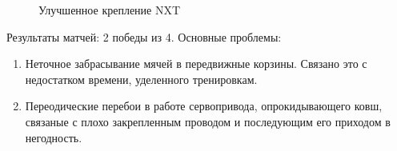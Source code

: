 \begin{enumerate}
	\begin{figure}[H]
		\begin{minipage}[h]{0.98\linewidth}
		\end{minipage}
		\caption{Улучшенное крепление NXT}
	\end{figure}
	Результаты матчей: 2 победы из 4. 
	\newline
    Основные проблемы:
    \begin{enumerate}
       \item Неточное забрасывание мячей в передвижные корзины. Связано это с недостатком времени, уделенного тренировкам.
       \item Переодические перебои в работе сервопривода, опрокидывающего ковш, связаные с плохо закрепленным проводом и последующим его приходом в негодность.
    \end{enumerate} 
\end{enumerate}
\fillpage